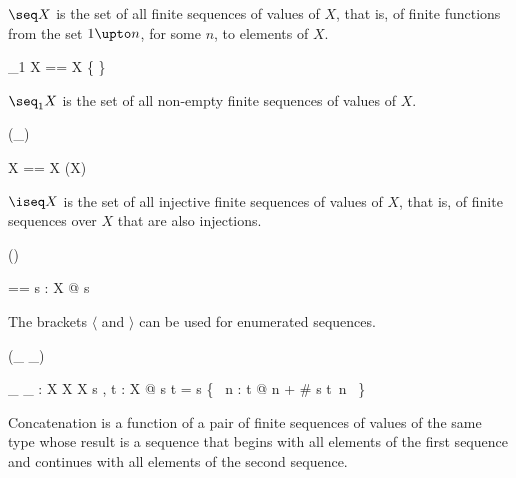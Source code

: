 \documentclass[draft,a4paper,10pt,wd]{isov2}
\begin{document}
$\seq X$ is the set of all finite sequences of values of $X$,
that is, of finite functions from the set $1 \upto n$,
for some $n$, to elements of $X$.


\begin{zed}
\seq_1 X == \seq X \setminus \{ \emptyset \}
\end{zed}

$\seq_1 X$ is the set of all non-empty finite sequences of values of $X$.


\begin{zed}
\generic (\iseq \_)
\end{zed}

\begin{zed}
\iseq X == \seq X \cap (\nat \pinj X)
\end{zed}

$\iseq X$ is the set of all injective finite sequences of values of $X$,
that is, of finite sequences over $X$ that are also injections.


\begin{zed}
\function (\langle \listarg \rangle)
\end{zed}

\begin{zed}
\langle \listarg \rangle [ X ]  == \lambda s : \seq X @ s
\end{zed}

The brackets $\langle$ and $\rangle$ can be used for enumerated sequences.


\begin{zed}
 \leftassoc (\_ \cat \_)
\end{zed}

\begin{gendef}[X]
\_ \cat \_ : \seq X \cross \seq X \fun \seq X
\where
\forall s , t : \seq X @
s \cat t = s \cup \{~ n : \dom t @ n + \# s \mapsto t~n ~\}
\end{gendef}

Concatenation is a function of a pair of finite sequences of
values of the same type whose result is a sequence that
begins with all elements of the first sequence and
continues with all elements of the second sequence.
\end{document}
